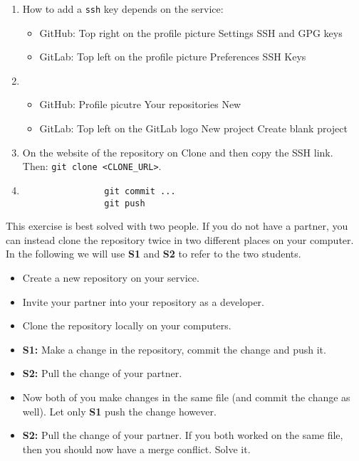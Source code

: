 \documentclass[english]{sheet}
\begin{document}
\begin{solution}
    \begin{enumerate}
        \item How to add a \verb|ssh| key depends on the service:
            \begin{itemize}
                \item GitHub: Top right on the profile picture \textrightarrow{} Settings \textrightarrow{} SSH and GPG keys
                \item GitLab: Top left on the profile picture \textrightarrow{} Preferences \textrightarrow{} SSH Keys
            \end{itemize}
        \item \begin{itemize}
                \item GitHub: Profile picutre \textrightarrow{} Your repositories \textrightarrow{} New
                \item GitLab: Top left on the GitLab logo \textrightarrow{} New project \textrightarrow{} Create blank project
            \end{itemize}
        \item On the website of the repository on Clone and then copy the SSH link.\\
            Then: \texttt{git clone <CLONE_URL>}.
        \item \begin{verbatim}
                git commit ...
                git push
            \end{verbatim}
    \end{enumerate}
\end{solution}

\begin{exercise}[subtitle={First Merge Conflict}]
    This exercise is best solved with two people. If you do not have a partner, you can instead clone the repository twice in two different places on your computer. In the following we will use \textbf{S1} and \textbf{S2} to refer to the two students.
    \begin{itemize}
        \item Create a new repository on your service.
        \item Invite your partner into your repository as a developer.
        \item Clone the repository locally on your computers.
        \item \textbf{S1:} Make a change in the repository, commit the change and push it.
        \item \textbf{S2:} Pull the change of your partner.
        \item Now both of you make changes in the same file (and commit the change as well). Let only \textbf{S1} push the change however.
        \item \textbf{S2:} Pull the change of your partner. If you both worked on the same file, then you should now have a merge conflict. Solve it.
    \end{itemize}
\end{exercise}
\end{document}
